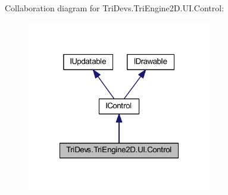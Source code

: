 Collaboration diagram for Tri\-Devs.\-Tri\-Engine2\-D.\-U\-I.\-Control\-:\nopagebreak
\begin{figure}[H]
\begin{center}
\leavevmode
\includegraphics[width=228pt]{class_tri_devs_1_1_tri_engine2_d_1_1_u_i_1_1_control__coll__graph}
\end{center}
\end{figure}
